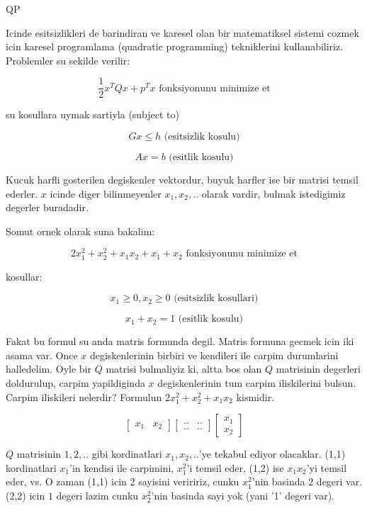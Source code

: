 \documentclass[12pt,fleqn]{article}\usepackage{../common}
\begin{document}
QP

Icinde esitsizlikleri de barindiran ve karesel olan bir matematiksel sistemi
cozmek icin karesel programlama (quadratic programming) tekniklerini
kullanabiliriz. Problemler su sekilde verilir:

\[ \frac{1}{2}x^TQx+p^Tx \textrm{ fonksiyonunu minimize et} \]

su kosullara uymak sartiyla (subject to)

\[ Gx \leq h \textrm{ (esitsizlik kosulu)} \]

\[ Ax = b \textrm{ (esitlik kosulu)} \]

Kucuk harfli gosterilen degiskenler vektordur, buyuk harfler ise bir matrisi
temsil ederler. $x$ icinde diger bilinmeyenler $x_1, x_2, ..$ olarak
vardir, bulmak istedigimiz degerler buradadir.

Somut ornek olarak suna bakalim:

\[ 2x_1^2 + x_2^2 + x_1x_2+x_1+x_2 \textrm{ fonksiyonunu minimize et} \]

kosullar:

\[ x_1 \geq 0, x_2 \geq 0 \textrm{ (esitsizlik kosullari)} \]

\[ x_1 + x_2 = 1 \textrm{ (esitlik kosulu)} \]

Fakat bu formul su anda matris formunda degil. Matris formuna gecmek icin iki
asama var. Once $x$ degiskenlerinin birbiri ve kendileri ile carpim durumlarini
halledelim. Oyle bir $Q$ matrisi bulmaliyiz ki, altta bos olan $Q$ matrisinin
degerleri doldurulup, carpim yapildiginda $x$ degiskenlerinin tum carpim
iliskilerini bulsun. Carpim iliskileri nelerdir?  Formulun $2x_1^2 + x_2^2 +
x_1x_2$ kismidir.

\[ 
\left[ \begin{array}{cc}
    x_1 & x_2 
\end{array} \right]
\left[ \begin{array}{cc}
    .. & .. \\
    .. & ..
\end{array} \right]
\left[ \begin{array}{c}
    x_1 \\
    x_2 
\end{array} \right]
 \]

$Q$ matrisinin $1,2,..$ gibi kordinatlari $x_1,x_2,..$'ye tekabul ediyor
olacaklar.  (1,1) kordinatlari $x_1$'in kendisi ile carpimini, $x_1^2$'i temsil
eder, (1,2) ise $x_1x_2$'yi temsil eder, vs. O zaman (1,1) icin 2 sayisini
veriririz, cunku $x_1^2$'nin basinda $2$ degeri var. (2,2) icin $1$ degeri lazim
cunku $x_2^2$'nin basinda sayi yok (yani '1' degeri var).
\end{document}
